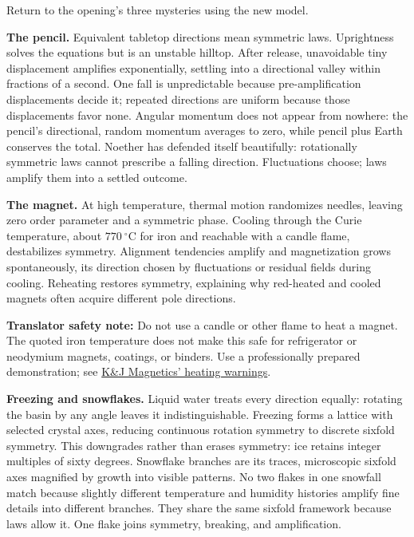 \begin{mainline}
Return to the opening's three mysteries using the new model.

\textbf{The pencil.} Equivalent tabletop directions mean symmetric laws. Uprightness solves the equations but is an unstable hilltop. After release, unavoidable tiny displacement amplifies exponentially, settling into a directional valley within fractions of a second. One fall is unpredictable because pre-amplification displacements decide it; repeated directions are uniform because those displacements favor none. Angular momentum does not appear from nowhere: the pencil's directional, random momentum averages to zero, while pencil plus Earth conserves the total. Noether has defended itself beautifully: rotationally symmetric laws cannot prescribe a falling direction. Fluctuations choose; laws amplify them into a settled outcome.

\textbf{The magnet.} At high temperature, thermal motion randomizes needles, leaving zero order parameter and a symmetric phase. Cooling through the Curie temperature, about \(770\ ^{\circ}\mathrm{C}\) for iron and reachable with a candle flame, destabilizes symmetry. Alignment tendencies amplify and magnetization grows spontaneously, its direction chosen by fluctuations or residual fields during cooling. Reheating restores symmetry, explaining why red-heated and cooled magnets often acquire different pole directions.

\textbf{Translator safety note:} Do not use a candle or other flame to heat a magnet. The quoted iron temperature does not make this safe for refrigerator or neodymium magnets, coatings, or binders. Use a professionally prepared demonstration; see \href{https://www.kjmagnetics.com/faq.asp}{K\&J Magnetics' heating warnings}.

\textbf{Freezing and snowflakes.} Liquid water treats every direction equally: rotating the basin by any angle leaves it indistinguishable. Freezing forms a lattice with selected crystal axes, reducing continuous rotation symmetry to discrete sixfold symmetry. This downgrades rather than erases symmetry: ice retains integer multiples of sixty degrees. Snowflake branches are its traces, microscopic sixfold axes magnified by growth into visible patterns. No two flakes in one snowfall match because slightly different temperature and humidity histories amplify fine details into different branches. They share the same sixfold framework because laws allow it. One flake joins symmetry, breaking, and amplification.


\end{mainline}
